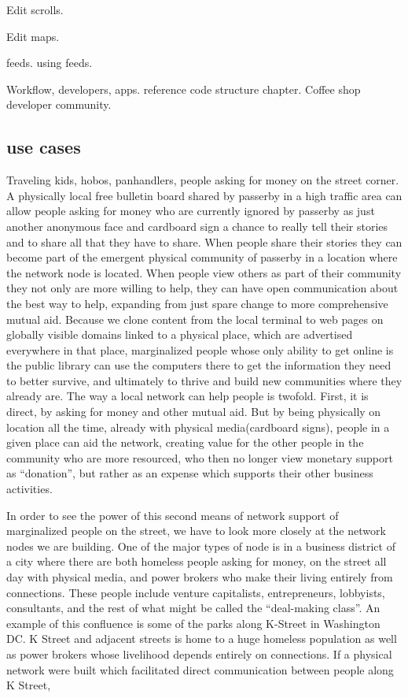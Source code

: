 Edit scrolls.

Edit maps.

feeds.  using feeds.

Workflow, developers, apps.  reference code structure chapter. Coffee shop developer community.

\subsection{use cases}

Traveling kids, hobos, panhandlers, people asking for money on the street corner.  A physically local free bulletin board shared by passerby in a high traffic area can allow people asking for money who are currently ignored by passerby as just another anonymous face and cardboard sign a chance to really tell their stories and to share all that they have to share.  When people share their stories they can become part of the emergent physical community of passerby in a location where the network node is located.  When people view others as part of their community they not only are more willing to help, they can have open communication about the best way to help, expanding from just spare change to more comprehensive mutual aid.  Because we clone content from the local terminal to web pages on globally visible domains linked to a physical place, which are advertised everywhere in that place, marginalized people whose only ability to get online is the public library can use the computers there to get the information they need to better survive, and ultimately to thrive and build new communities where they already are.  The way a local network can help people is twofold. First, it is direct, by asking for money and other mutual aid.  But by being physically on location all the time, already with physical media(cardboard signs), people in a given place can aid the network, creating value for the other people in the community who are more resourced, who then no longer view monetary support as ``donation'', but rather as an expense which supports their other business activities.  

In order to see the power of this second means of network support of marginalized people on the street, we have to look more closely at the network nodes we are building.  One of the major types of node is in a business district of a city where there are both homeless people asking for money, on the street all day with physical media, and power brokers who make their living entirely from connections.  These people include venture capitalists, entrepreneurs, lobbyists, consultants, and the rest of what might be called the ``deal-making class''.  An example of this confluence is some of the parks along K-Street in Washington DC.  K Street and adjacent streets is home to a huge homeless population as well as power brokers whose livelihood depends entirely on connections.  If a physical network were built which facilitated direct communication between people along K Street,


